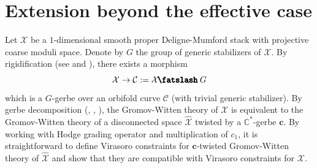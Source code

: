 \documentclass[letterpaper,12pt]{amsart}
\theoremstyle{definition}
\newcommand{\thickslash}{\mathbin{\!\!\pmb{\fatslash}}}
\numberwithin{equation}{section}
\begin{document}
{\large \part{Extension beyond the effective case}\label{part:gerbe-extension}}


Let $\mathcal{X}$ be a $1$-dimensional smooth proper Deligne-Mumford stack with projective coarse moduli space. Denote by $G$ the group of generic stabilizers of $\mathcal{X}$. By rigidification (see \cite{ACV} and \cite{AGV}), there exists a morphism 
\begin{equation*}
\mathcal{X}\to \mathcal{C}:=\mathcal{X}\thickslash G    
\end{equation*}
which is a $G$-gerbe over an orbifold curve $\mathcal{C}$ (with trivial generic stabilizer). By gerbe decomposition (\cite{HHPS}, \cite{TT1}, \cite{TT3}), the Gromov-Witten theory of $\mathcal{X}$ is equivalent to the Gromov-Witten theory of a disconnected space $\widehat{\mathcal{X}}$ twisted by a $\mathbb{C}^*$-gerbe $\mathbf{c}$. By working with Hodge grading operator and multiplication of $c_1$, it is straightforward to define Virasoro constraints for $\mathbf{c}$-twisted Gromov-Witten theory of $\widehat{\mathcal{X}}$ and show that they are compatible with Virasoro constraints for $\mathcal{X}$. 
\end{document}
